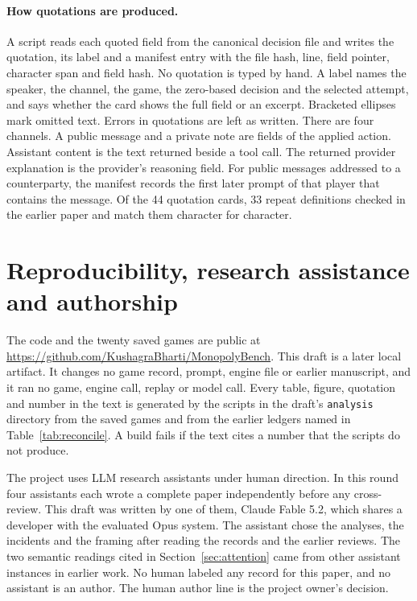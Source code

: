 \paragraph{How quotations are produced.} A script reads each quoted field from the canonical decision file and writes the quotation, its label and a manifest entry with the file hash, line, field pointer, character span and field hash. No quotation is typed by hand. A label names the speaker, the channel, the game, the zero-based decision and the selected attempt, and says whether the card shows the full field or an excerpt. Bracketed ellipses mark omitted text. Errors in quotations are left as written. There are four channels. A public message and a private note are fields of the applied action. Assistant content is the text returned beside a tool call. The returned provider explanation is the provider's reasoning field. For public messages addressed to a counterparty, the manifest records the first later prompt of that player that contains the message. Of the 44 quotation cards, 33 repeat definitions checked in the earlier paper and match them character for character.

\section{Reproducibility, research assistance and authorship}
\label{app:repro}

The code and the twenty saved games are public at \url{https://github.com/KushagraBharti/MonopolyBench}. This draft is a later local artifact. It changes no game record, prompt, engine file or earlier manuscript, and it ran no game, engine call, replay or model call. Every table, figure, quotation and number in the text is generated by the scripts in the draft's \texttt{analysis} directory from the saved games and from the earlier ledgers named in Table~\ref{tab:reconcile}. A build fails if the text cites a number that the scripts do not produce.

The project uses LLM research assistants under human direction. In this round four assistants each wrote a complete paper independently before any cross-review. This draft was written by one of them, Claude Fable 5.2, which shares a developer with the evaluated Opus system. The assistant chose the analyses, the incidents and the framing after reading the records and the earlier reviews. The two semantic readings cited in Section~\ref{sec:attention} came from other assistant instances in earlier work. No human labeled any record for this paper, and no assistant is an author. The human author line is the project owner's decision.
